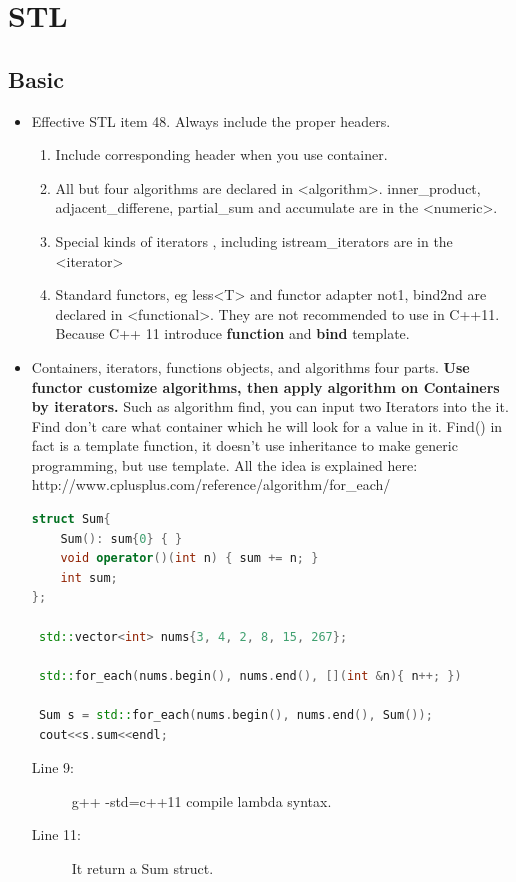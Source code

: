 \documentclass[a4paper,11pt,twoside]{book}
\begin{document}
\chapter{STL}
\section{Basic}
\begin{itemize}
\item Effective STL item 48. Always include the proper headers.
\begin{enumerate}
\item Include corresponding header when you use container.
\item All but four algorithms are declared in <algorithm>. inner\_product, adjacent\_differene, partial\_sum and accumulate are in the <numeric>.
\item Special kinds of iterators , including istream\_iterators are in the <iterator>
\item Standard functors, eg less<T> and functor adapter not1, bind2nd are declared in <functional>. They are not recommended to use in C++11. Because C++ 11 introduce \textbf{function} and \textbf{bind} template.
\end{enumerate}


\item Containers, iterators, functions objects, and algorithms four parts. \textbf{Use functor customize algorithms, then apply algorithm on Containers by iterators.} Such as algorithm find, you can input two Iterators into the it.  Find don't care what container which he will look for a value in it.  Find() in fact is a template function, it doesn't use inheritance to make generic programming, but use template.   All the idea is explained here:\newline
http://www.cplusplus.com/reference/algorithm/for\_each/

\begin{lstlisting}[frame=single, language=c++]
struct Sum{
    Sum(): sum{0} { }
    void operator()(int n) { sum += n; }
    int sum;
};

 std::vector<int> nums{3, 4, 2, 8, 15, 267};

 std::for_each(nums.begin(), nums.end(), [](int &n){ n++; })
 
 Sum s = std::for_each(nums.begin(), nums.end(), Sum());
 cout<<s.sum<<endl;
\end{lstlisting}
\begin{description}
	\item[Line 9:]  g++ -std=c++11 compile lambda syntax.
	\item[Line 11:] It return a Sum struct.
\end{description}

\end{itemize}
\end{document}
